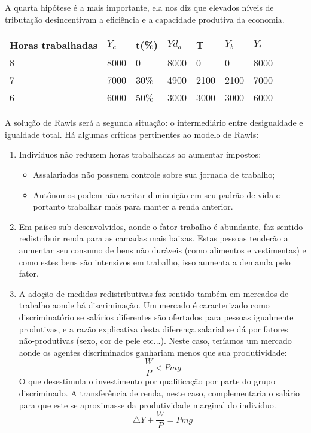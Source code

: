 \documentclass[12pt,a4paper,oneside,brazil]{abntex2}
\begin{document}
A quarta hipótese é a mais importante, ela nos diz que elevados níveis de tributação desincentivam a eficiência e a capacidade produtiva da economia.

\begin{table}[h]
\centering
\begin{tabular}{|l|l|l|l|l|l|l|}
\hline
Horas trabalhadas & $Y_a$ & t(\%) & $Yd_a$ & T    & $Y_b$ & $Y_t$ \\ \hline
8                 & 8000  & 0     & 8000   & 0    & 0     & 8000  \\ \hline
7                 & 7000  & 30\%  & 4900   & 2100 & 2100  & 7000  \\ \hline
6                 & 6000  & 50\%  & 3000   & 3000 & 3000  & 6000  \\ \hline
\end{tabular}
\end{table}
A solução de Rawls será a segunda situação: o intermediário entre desigualdade e igualdade total. Há algumas críticas pertinentes ao modelo de Rawls:
\begin{enumerate}
\item Indivíduos não reduzem horas trabalhadas ao aumentar impostos:
\begin{itemize}
\item Assalariados não possuem controle sobre sua jornada de trabalho;
\item Autônomos podem não aceitar diminuição em seu padrão de vida e portanto trabalhar mais para manter a renda anterior.
\end{itemize}
\item Em países sub-desenvolvidos, aonde o fator trabalho é abundante, faz sentido redistribuir renda para as camadas mais baixas. Estas pessoas tenderão a aumentar seu consumo de bens não duráveis (como alimentos e vestimentas) e como estes bens são intensivos em trabalho, isso aumenta a demanda pelo fator.
\item A adoção de medidas redistributivas faz sentido também em mercados de trabalho aonde há discriminação. Um mercado é caracterizado como discriminatório se salários diferentes são ofertados para pessoas igualmente produtivas, e a razão explicativa desta diferença salarial se dá por fatores não-produtivas (sexo, cor de pele etc...). Neste caso, teríamos um mercado aonde os agentes discriminados ganhariam menos que sua produtividade:
\[ \frac{W}{P} < Pmg \]
O que desestimula o investimento por qualificação por parte do grupo discriminado. A transferência de renda, neste caso, complementaria o salário para que este se aproximasse da produtividade marginal do indivíduo.
\[ \triangle Y + \frac{W}{P} = Pmg \]
\end{enumerate}
\end{document}
